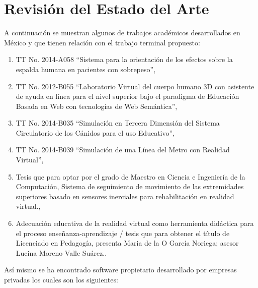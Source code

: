 \section{Revisión del Estado del Arte}
A continuación se muestran algunos de trabajos académicos desarrollados en México y que tienen relación con el trabajo terminal propuesto:\\
\newline
\begin{enumerate}
\item TT No. 2014-A058 “Sistema para la orientación de los efectos sobre la espalda humana en pacientes con sobrepeso”\cite{tt1},
\item TT No. 2012-B055 “Laboratorio Virtual del cuerpo humano 3D con asistente de ayuda en línea para el nivel superior bajo el paradigma de Educación Basada en Web con 
tecnologías de Web Semántica”\cite{tt2},
\item TT No. 2014-B035 “Simulación en Tercera Dimensión del Sistema Circulatorio de los Cánidos para el uso Educativo”\cite{tt3},
\item TT No. 2014-B039 “Simulación de una Línea del Metro con Realidad Virtual”\cite{tt4},
\item Tesis que para optar por el grado de Maestro en Ciencia e Ingeniería de la Computación, Sistema de seguimiento de movimiento de las extremidades superiores basado 
en sensores inerciales para rehabilitación en realidad virtual.\cite{mastersthesis1},
\item Adecuación educativa de la realidad virtual como herramienta didáctica para el proceso enseñanza-aprendizaje / tesis que para obtener el título de Licenciado en 
Pedagogía, presenta Maria de la O García Noriega; asesor Lucina Moreno Valle Suárez.\cite{te1}.
\end{enumerate}
Así mismo se ha encontrado software propietario desarrollado por empresas privadas los cuales son los siguientes:\\
